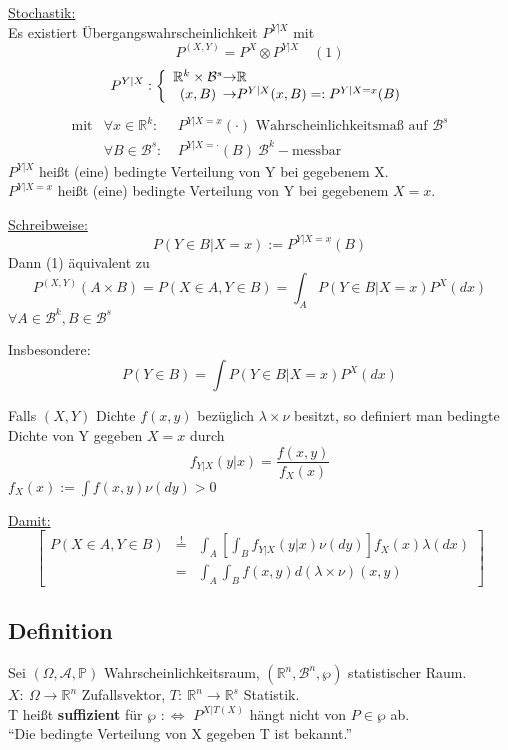\documentclass[a4paper,11pt,twoside,titlepage]{article}
\newcommand{\R}{{\mathbb R}}
\newcommand{\PP}{{\mathbb P}} %
\newcommand\AAA{ \mathcal{A} } %
\newcommand\BB{ \mathcal{B} } %
\begin{document}
\underline{Stochastik:}\\
Es existiert Übergangswahrscheinlichkeit $P^{Y|X}$ mit $$P^{(X,Y)}=P^X\otimes P^{Y|X}\quad(1)$$
\[P^{Y|X}:\left\{\begin{array}{c@{\to}l}\R^k\times \BB^s&\R\\(x,B)&P^{Y|X}(x,B)=:P^{Y|X=x}(B)\end{array}\right.\]
\[\begin{array}{lll}\mbox{mit}&\forall x\in\R^k:&\ P^{Y|X=x}(\cdot)\mbox{ Wahrscheinlichkeitsmaß auf }\BB^s\\
&\forall B\in\BB^s:&\ P^{Y|X=\cdot}(B)\ \BB^k-\mbox{messbar}\end{array}\]
$P^{Y|X}$ heißt (eine) bedingte Verteilung von Y bei gegebenem X.\\
$P^{Y|X=x}$ heißt (eine) bedingte Verteilung von Y bei gegebenem $X=x$.

\underline{Schreibweise:}
\[P(Y\in B|X=x):=P^{Y|X=x}(B)\]
Dann (1) äquivalent zu 
\[P^{(X,Y)}(A\times B)=P(X\in A,Y\in B)=\int_A P(Y\in B|X=x)P^X(dx)\] $\forall A\in\BB^k, B\in\BB^s$

Insbesondere:
\[P(Y\in B)=\int P(Y\in B|X=x)P^X(dx)\]

Falls $(X,Y)$ Dichte $f(x,y)$ bezüglich $\lambda\times\nu$ besitzt, so definiert man bedingte Dichte von Y gegeben $X=x$ durch
\[f_{Y|X}(y|x)=\frac{f(x,y)}{f_X(x)}\]
$f_X(x):=\int f(x,y)\nu(dy)>0$

\underline{Damit:}\\
\[\left[\begin{array}{rcl}P(X\in A,Y\in B)&\stackrel{!}{=}&\int_A[\int_B f_{Y|X}(y|x)\nu(dy)]f_X(x)\lambda(dx)\\
&=&\int_A\int_B f(x,y)d(\lambda\times\nu)(x,y)\end{array}\right]\]

\subsection{Definition}
Sei $(\Omega,\AAA,\PP)$ Wahrscheinlichkeitsraum, $(\R^n,\BB^n,\wp)$ statistischer Raum.\\ $X:\ \Omega\to\R^n$ Zufallsvektor, $T:\ \R^n\to\R^s$ Statistik.\\
T heißt \textbf{suffizient} für $\wp$ $:\Leftrightarrow$ $P^{X|T(X)}$ hängt nicht von $P\in\wp$ ab.\\
"`Die bedingte Verteilung von X gegeben T ist bekannt."'
\end{document}
